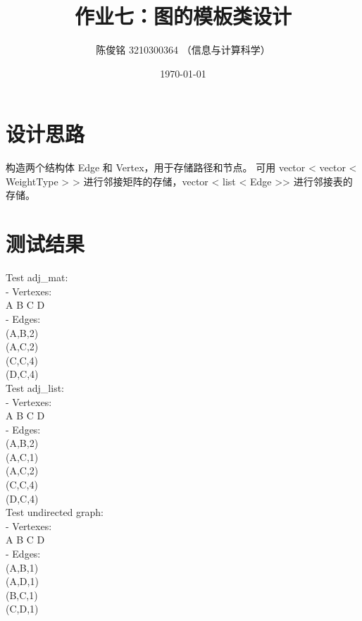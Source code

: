 \documentclass[a4paper]{article}
\title{作业七：图的模板类设计}
\author{陈俊铭 3210300364 （信息与计算科学）}
\date{\today}
\begin{document}
\maketitle
\section{设计思路}
构造两个结构体 Edge 和 Vertex，用于存储路径和节点。
可用 vector < vector < WeightType > > 进行邻接矩阵的存储，vector < list < Edge >> 进行邻接表的存储。

\section{测试结果}
\noindent Test adj\_mat: \\
- Vertexes:\\
A B C D\\
- Edges:\\
(A,B,2)\\
(A,C,2)\\
(C,C,4)\\
(D,C,4)\\

\noindent Test adj\_list:\\
- Vertexes:\\
A B C D\\
- Edges:\\
(A,B,2)\\
(A,C,1)\\
(A,C,2)\\
(C,C,4)\\
(D,C,4)\\

\noindent Test undirected graph:\\
- Vertexes:\\
A B C D\\
- Edges:\\
(A,B,1)\\
(A,D,1)\\
(B,C,1)\\
(C,D,1)\\
\end{document}
